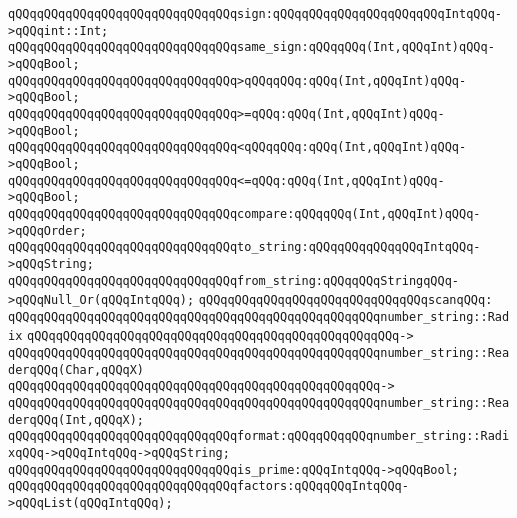 \verb|qQQqqQQqqQQqqQQqqQQqqQQqqQQqqQQqsign:qQQqqQQqqQQqqQQqqQQqqQQqIntqQQq->qQQqint::Int;|\newline
\verb|qQQqqQQqqQQqqQQqqQQqqQQqqQQqqQQqsame_sign:qQQqqQQq(Int,qQQqInt)qQQq->qQQqBool;|\newline
\newline
\verb|qQQqqQQqqQQqqQQqqQQqqQQqqQQqqQQq>qQQqqQQq:qQQq(Int,qQQqInt)qQQq->qQQqBool;|\newline
\verb|qQQqqQQqqQQqqQQqqQQqqQQqqQQqqQQq>=qQQq:qQQq(Int,qQQqInt)qQQq->qQQqBool;|\newline
\verb|qQQqqQQqqQQqqQQqqQQqqQQqqQQqqQQq<qQQqqQQq:qQQq(Int,qQQqInt)qQQq->qQQqBool;|\newline
\verb|qQQqqQQqqQQqqQQqqQQqqQQqqQQqqQQq<=qQQq:qQQq(Int,qQQqInt)qQQq->qQQqBool;|\newline
\newline
\verb|qQQqqQQqqQQqqQQqqQQqqQQqqQQqqQQqcompare:qQQqqQQq(Int,qQQqInt)qQQq->qQQqOrder;|\newline
\newline
\verb|qQQqqQQqqQQqqQQqqQQqqQQqqQQqqQQqto_string:qQQqqQQqqQQqqQQqIntqQQq->qQQqString;|\newline
\verb|qQQqqQQqqQQqqQQqqQQqqQQqqQQqqQQqfrom_string:qQQqqQQqStringqQQq->qQQqNull_Or(qQQqIntqQQq);|\newline
\newline
\verb|qQQqqQQqqQQqqQQqqQQqqQQqqQQqqQQqscanqQQq:|\newline
\verb|qQQqqQQqqQQqqQQqqQQqqQQqqQQqqQQqqQQqqQQqqQQqqQQqqQQqnumber_string::Radix|\newline
\verb|qQQqqQQqqQQqqQQqqQQqqQQqqQQqqQQqqQQqqQQqqQQqqQQqqQQq->|\newline
\verb|qQQqqQQqqQQqqQQqqQQqqQQqqQQqqQQqqQQqqQQqqQQqqQQqqQQqnumber_string::ReaderqQQq(Char,qQQqX)|\newline
\verb|qQQqqQQqqQQqqQQqqQQqqQQqqQQqqQQqqQQqqQQqqQQqqQQqqQQq->|\newline
\verb|qQQqqQQqqQQqqQQqqQQqqQQqqQQqqQQqqQQqqQQqqQQqqQQqqQQqnumber_string::ReaderqQQq(Int,qQQqX);|\newline
\newline
\verb|qQQqqQQqqQQqqQQqqQQqqQQqqQQqqQQqformat:qQQqqQQqqQQqnumber_string::RadixqQQq->qQQqIntqQQq->qQQqString;|\newline
\newline
\verb|qQQqqQQqqQQqqQQqqQQqqQQqqQQqqQQqis_prime:qQQqIntqQQq->qQQqBool;|\newline
\verb|qQQqqQQqqQQqqQQqqQQqqQQqqQQqqQQqfactors:qQQqqQQqIntqQQq->qQQqList(qQQqIntqQQq);|\newline
